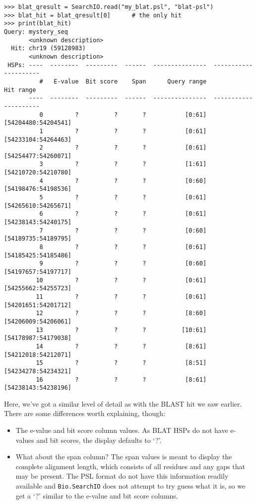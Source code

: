 \begin{verbatim}
>>> blat_qresult = SearchIO.read("my_blat.psl", "blat-psl")
>>> blat_hit = blat_qresult[0]      # the only hit
>>> print(blat_hit)
Query: mystery_seq
       <unknown description>
  Hit: chr19 (59128983)
       <unknown description>
 HSPs: ----  --------  ---------  ------  ---------------  ---------------------
          #   E-value  Bit score    Span      Query range              Hit range
       ----  --------  ---------  ------  ---------------  ---------------------
          0         ?          ?       ?           [0:61]    [54204480:54204541]
          1         ?          ?       ?           [0:61]    [54233104:54264463]
          2         ?          ?       ?           [0:61]    [54254477:54260071]
          3         ?          ?       ?           [1:61]    [54210720:54210780]
          4         ?          ?       ?           [0:60]    [54198476:54198536]
          5         ?          ?       ?           [0:61]    [54265610:54265671]
          6         ?          ?       ?           [0:61]    [54238143:54240175]
          7         ?          ?       ?           [0:60]    [54189735:54189795]
          8         ?          ?       ?           [0:61]    [54185425:54185486]
          9         ?          ?       ?           [0:60]    [54197657:54197717]
         10         ?          ?       ?           [0:61]    [54255662:54255723]
         11         ?          ?       ?           [0:61]    [54201651:54201712]
         12         ?          ?       ?           [8:60]    [54206009:54206061]
         13         ?          ?       ?          [10:61]    [54178987:54179038]
         14         ?          ?       ?           [8:61]    [54212018:54212071]
         15         ?          ?       ?           [8:51]    [54234278:54234321]
         16         ?          ?       ?           [8:61]    [54238143:54238196]
\end{verbatim}

Here, we've got a similar level of detail as with the BLAST hit we saw earlier.
There are some differences worth explaining, though:

\begin{itemize}
\item The e-value and bit score column values. As BLAT HSPs do not have e-values
    and bit scores, the display defaults to `?'.
\item What about the span column? The span values is meant to display the
    complete alignment length, which consists of all residues and any gaps that
    may be present. The PSL format do not have this information readily available
    and \verb|Bio.SearchIO| does not attempt to try guess what it is, so we get a
    `?' similar to the e-value and bit score columns.
\end{itemize}


